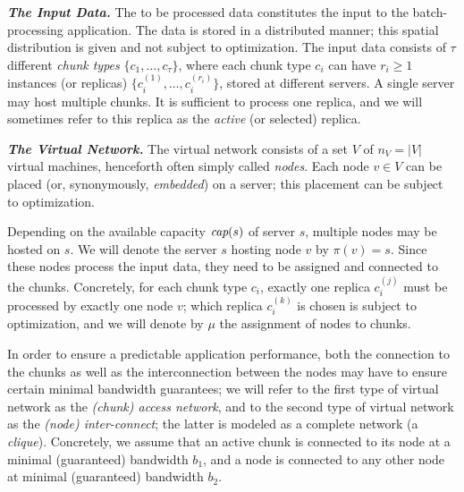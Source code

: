 \documentclass[conference,10pt]{IEEEtran}
\newcommand{\MaFactor}{m}
\newcommand{\ChunkType}{\tau}
\newcommand{\VirtualNodes}{\ensuremath{V}}
\newcommand{\achunk}{\ensuremath{c}}
\newcommand{\capacity}{\emph{cap}}
\newcommand{\CostTrans}{\ensuremath{b_1}}
\newcommand{\CostCom}{\ensuremath{b_2}}
\begin{document}
\textbf{\emph{The Input Data.}} The to be processed data constitutes the input to the batch-processing application.
The data is stored in a distributed manner; this spatial distribution is given and not subject to optimization.
The input data consists of $\tau$ different \emph{chunk types} $\{\achunk_1, \ldots, \achunk_{\ChunkType}\}$,
where each chunk type $\achunk_i$ can have $r_i\geq 1$ instances (or replicas) $\{\achunk_{i}^{(1)},\ldots, \achunk_{i}^{(r_i)}\}$,
 stored at different servers. A single server may host multiple chunks.
It is sufficient to process one replica, and we will sometimes refer to this
replica as the \emph{active} (or selected) replica.

\textbf{\emph{The Virtual Network.}} The virtual network consists of a set $\VirtualNodes$ of $n_V=|\VirtualNodes|$ virtual machines,
henceforth often simply called \emph{nodes}.
Each node $v \in \VirtualNodes$ can be placed (or, synonymously, \emph{embedded}) on a server; this placement can be subject
to optimization.

Depending on the available capacity $\capacity(s)$ of server $s$, multiple nodes may be hosted on $s$.
We will denote the server $s$ hosting node $v$ by $\pi(v)=s$.
Since these nodes process the input data, they need to be assigned and connected to the
chunks. Concretely, for each chunk type $\achunk_i$, exactly one
replica $\achunk_{i}^{(j)}$ must be processed by exactly one node $v$;
which replica $\achunk_{i}^{(k)}$ is chosen is subject to optimization, and
we will denote by $\mu$ the assignment of nodes to chunks.

In order to ensure a predictable application performance, both the connection to the chunks
as well as the interconnection between the nodes may have to ensure certain
minimal bandwidth guarantees; we will refer to the first type of virtual network as the \emph{(chunk) access
network}, and to the second type of virtual network as the \emph{(node) inter-connect}; the latter
is modeled as a complete network (a \emph{clique}). Concretely, we assume that an  active chunk
is connected to its node at a minimal (guaranteed) bandwidth $\CostTrans$, and a node is connected to any other node
at minimal (guaranteed) bandwidth $\CostCom$.
\end{document}

